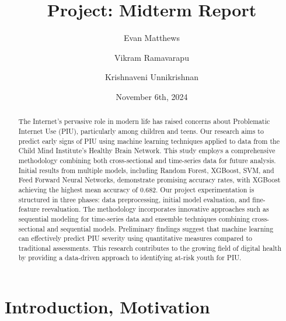 \documentclass[12pt]{extarticle}
\title{Project: Midterm Report}
\author[1]{Evan Matthews}
\author[1]{Vikram Ramavarapu}
\author[1]{Krishnaveni Unnikrishnan}
\affil[1]{CS 412 Group G6}
\date{November 6th, 2024}
\begin{document}
\maketitle

\begin{abstract}
    The Internet's pervasive role in modern life has raised concerns about Problematic Internet Use (PIU), particularly among children and teens. 
    Our research aims to predict early signs of PIU using machine learning techniques applied to data from the Child Mind Institute's Healthy Brain Network. 
    This study employs a comprehensive methodology combining both cross-sectional and time-series data for future analysis. 
    Initial results from multiple models, including Random Forest, XGBoost, SVM, and Feed Forward Neural Networks, demonstrate promising accuracy rates, with XGBoost achieving the highest mean accuracy of 0.682. 
    Our project experimentation is structured in three phases: data preprocessing, initial model evaluation, and fine-feature reevaluation. 
    The methodology incorporates innovative approaches such as sequential modeling for time-series data and ensemble techniques combining cross-sectional and sequential models. 
    Preliminary findings suggest that machine learning can effectively predict PIU severity using quantitative measures compared to traditional assessments. 
    This research contributes to the growing field of digital health by providing a data-driven approach to identifying at-risk youth for PIU.
\end{abstract}

\pagebreak


\section{Introduction, Motivation}
\end{document}
